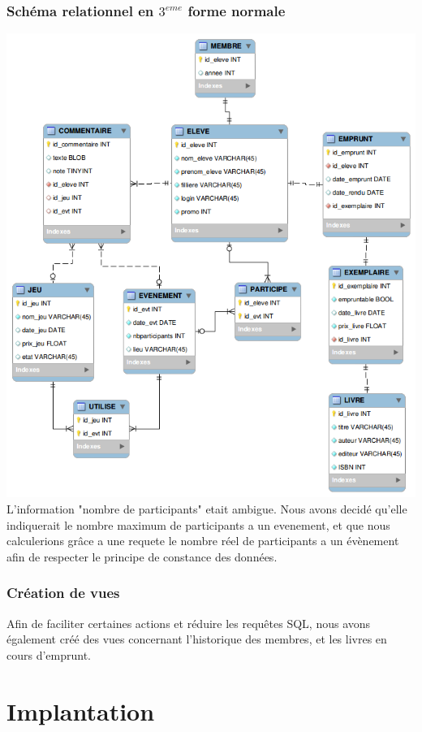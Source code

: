 \documentclass[a4paper, 11pt]{article}
\begin{document}
\section{Schéma relationnel en $3^{eme}$ forme normale}
\includegraphics[width=1\textwidth]{relationnel.png}
\\L'information "nombre de participants" etait ambigue. Nous avons decidé qu'elle indiquerait le nombre maximum de participants a un evenement, et que nous calculerions grâce a une requete le nombre réel de participants a un évènement afin de respecter le principe de constance des données.
\section{Création de vues}
Afin de faciliter certaines actions et réduire les requêtes SQL, nous avons également créé des vues concernant l'historique des membres, et les livres en cours d'emprunt.

\newpage
\part{Implantation}
\setcounter{section}{0}
\end{document}
